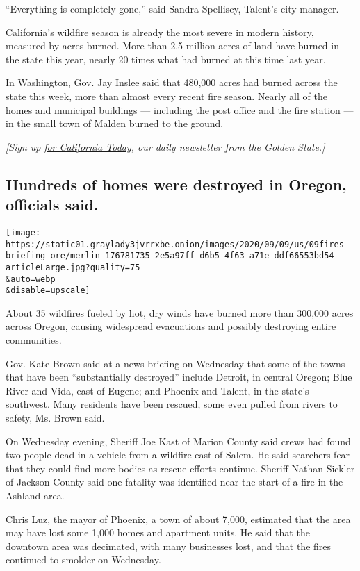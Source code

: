 ``Everything is completely gone,'' said Sandra Spelliscy, Talent's city
manager.

California's wildfire season is already the most severe in modern
history, measured by acres burned. More than 2.5 million acres of land
have burned in the state this year, nearly 20 times what had burned at
this time last year.

In Washington, Gov. Jay Inslee said that 480,000 acres had burned across
the state this week, more than almost every recent fire season. Nearly
all of the homes and municipal buildings --- including the post office
and the fire station --- in the small town of Malden burned to the
ground.

\emph{{[}Sign up}
\href{https://www.nytimes3xbfgragh.onion/newsletters/california-today}{\emph{for
California Today}}\emph{, our daily newsletter from the Golden
State.{]}}

\hypertarget{hundreds-of-homes-were-destroyed-in-oregon-officials-said}{%
\subsection{Hundreds of homes were destroyed in Oregon, officials
said.}\label{hundreds-of-homes-were-destroyed-in-oregon-officials-said}}

\texttt{[image: https://static01.graylady3jvrrxbe.onion/images/2020/09/09/us/09fires-briefing-ore/merlin\_176781735\_2e5a97ff-d6b5-4f63-a71e-ddf66553bd54-articleLarge.jpg?quality=75\\\&auto=webp\\\&disable=upscale]}

About 35 wildfires fueled by hot, dry winds have burned more than
300,000 acres across Oregon, causing widespread evacuations and possibly
destroying entire communities.

Gov. Kate Brown said at a news briefing on Wednesday that some of the
towns that have been ``substantially destroyed'' include Detroit, in
central Oregon; Blue River and Vida, east of Eugene; and Phoenix and
Talent, in the state's southwest. Many residents have been rescued, some
even pulled from rivers to safety, Ms. Brown said.

On Wednesday evening, Sheriff Joe Kast of Marion County said crews had
found two people dead in a vehicle from a wildfire east of Salem. He
said searchers fear that they could find more bodies as rescue efforts
continue. Sheriff Nathan Sickler of Jackson County said one fatality was
identified near the start of a fire in the Ashland area.

Chris Luz, the mayor of Phoenix, a town of about 7,000, estimated that
the area may have lost some 1,000 homes and apartment units. He said
that the downtown area was decimated, with many businesses lost, and
that the fires continued to smolder on Wednesday.

